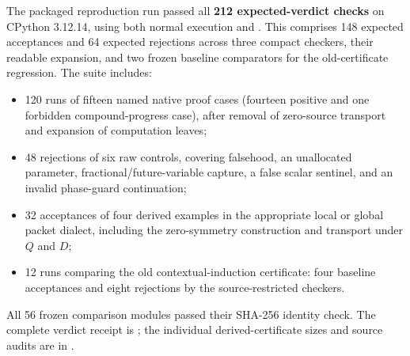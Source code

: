 The packaged reproduction run passed all \textbf{212 expected-verdict checks}
on CPython 3.12.14, using both normal execution and .
This comprises 148 expected acceptances and 64 expected rejections across
three compact checkers, their readable expansion, and two frozen baseline
comparators for the old-certificate regression. The suite includes:
\begin{itemize}
\item 120 runs of fifteen named native proof cases (fourteen positive and
one forbidden compound-progress case), after removal of zero-source
transport and expansion of computation leaves;
\item 48 rejections of six raw controls, covering falsehood, an unallocated
parameter, fractional/future-variable capture, a false scalar sentinel, and
an invalid phase-guard continuation;
\item 32 acceptances of four derived examples in the appropriate local or
global packet dialect, including the zero-symmetry construction and
transport under $Q$ and $D$;
\item 12 runs comparing the old contextual-induction certificate: four
baseline acceptances and eight rejections by the source-restricted checkers.
\end{itemize}
All 56 frozen comparison modules passed their SHA-256 identity check.
The complete verdict receipt is ; the
individual derived-certificate sizes and source audits are in
.

